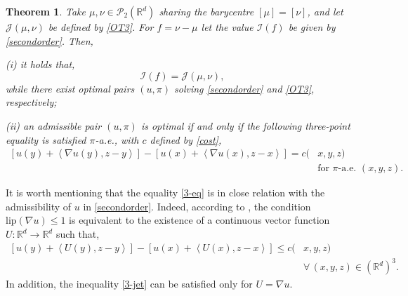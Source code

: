 \documentclass[11pt,letterpaper,reqno]{amsart}
\newtheorem{theorem}{Theorem}[section]
\theoremstyle{definition}
\numberwithin{equation}{section}
\newcommand{\med}{\medskip\noindent}
\newcommand{\R}{\mathbb{R}}
\newcommand{\Rd}{\R^d}
\newcommand{\JJ}{\mathcal{J}}
\newcommand{\PP}{\mathcal{P}}
\newcommand{\pairing}[1]{{\left \langle #1 \right \rangle}}
\newcommand{\Lip}{{\mathrm{lip}}}
\newcommand{\I}{\mathcal{I}}
\begin{document}
\begin{theorem}\label{main-intro} Take $\mu, \nu \in\PP_2(\Rd)$ sharing the barycentre $[\mu]=[\nu]$, and  let $\JJ(\mu,\nu)$ be defined by \eqref{OT3}.
For  $f=\nu-\mu$ let the value $\I(f)$ be given by \eqref{secondorder}. Then,

\med (i) it holds that,
\begin{equation}
    \label{central_eq}
    \I(f) = \JJ(\mu,\nu),
\end{equation}
while  there exist optimal pairs $(u,\pi)$ solving  \eqref{secondorder} and  \eqref{OT3}, respectively;

\med (ii) an admissible pair $(u,\pi)$ is optimal if and only if the following three-point equality is satisfied  $\pi$-a.e.,
with $c$ defined by \eqref{cost},
\begin{align}\label{3-eq}
[u(y) + \pairing{\nabla u(y), z-y}] -[u(x) + \pairing{\nabla u(x), z-x} ] 
= c(&x,y,z) \\
\nonumber
& \text{for $\pi$-a.e. $(x,y,z)$.}
\end{align}

\end{theorem}

It is worth mentioning  that the equality \eqref{3-eq} is in close relation with the admissibility of $u$ in \eqref{secondorder}. Indeed, according to  \cite{legruyer2009}, the condition $\Lip(\nabla u)\le 1$ is equivalent to the  existence of a continuous vector function $U:\R^d\to \R^d$
such that,
\begin{align}\label{3-jet}
 [u(y) + \pairing{{U(y)}, z-y}]  - [u(x) + \pairing{{ U(x)}, z-x} ]
\le c(&x,y,z) \\
\nonumber
 &\forall\, (x,y, z) \in (\Rd)^3 .
\end{align}
In addition,  the inequality \eqref{3-jet} can be satisfied only for {$U= \nabla u$}. 
\end{document}
